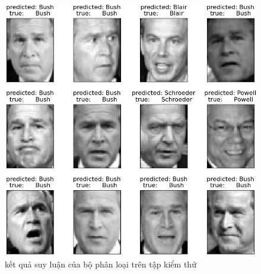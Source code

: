 \documentclass[12pt,a4paper,oneside]{report}
\numberwithin{equation}{section}
\begin{document}
\begin{figure}[htp]
	\centering
	\includegraphics[scale=0.8]{predict_pca.png}
	\caption{kết quả suy luận của bộ phân loại trên tập kiểm thử}
	\label{fig:output}
\end{figure}
\end{document}
